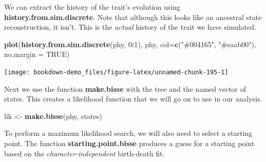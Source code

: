 \documentclass[
]{book}
\newenvironment{Shaded}{\begin{snugshade}}{\end{snugshade}}
\newcommand{\DataTypeTok}[1]{\textcolor[rgb]{0.13,0.29,0.53}{#1}}
\newcommand{\DecValTok}[1]{\textcolor[rgb]{0.00,0.00,0.81}{#1}}
\newcommand{\KeywordTok}[1]{\textcolor[rgb]{0.13,0.29,0.53}{\textbf{#1}}}
\newcommand{\NormalTok}[1]{#1}
\newcommand{\OperatorTok}[1]{\textcolor[rgb]{0.81,0.36,0.00}{\textbf{#1}}}
\newcommand{\OtherTok}[1]{\textcolor[rgb]{0.56,0.35,0.01}{#1}}
\newcommand{\StringTok}[1]{\textcolor[rgb]{0.31,0.60,0.02}{#1}}
\begin{document}
\begin{Shaded}
\end{Shaded}

We can extract the history of the trait's evolution using \textbf{history.from.sim.discrete}. Note that although this looks like an ancestral state reconstruction, it isn't. This is the \emph{actual} history of the trait we have simulated.

\begin{Shaded}
\begin{Highlighting}[]
\KeywordTok{plot}\NormalTok{(}\KeywordTok{history.from.sim.discrete}\NormalTok{(phy, }\DecValTok{0}\OperatorTok{:}\DecValTok{1}\NormalTok{), }
\NormalTok{     phy, }\DataTypeTok{col=}\KeywordTok{c}\NormalTok{(}\StringTok{"\#004165"}\NormalTok{, }\StringTok{"\#eaab00"}\NormalTok{), }\DataTypeTok{no.margin =} \OtherTok{TRUE}\NormalTok{)}
\end{Highlighting}
\end{Shaded}

\begin{center}\texttt{[image: bookdown-demo\_files/figure-latex/unnamed-chunk-195-1]} \end{center}

Next we use the function \textbf{make.bisse} with the tree and the named vector of states. This creates a likelihood function that we will go on to use in our analysis.

\begin{Shaded}
\begin{Highlighting}[]
\NormalTok{lik \textless{}{-}}\StringTok{ }\KeywordTok{make.bisse}\NormalTok{(phy, states)}
\end{Highlighting}
\end{Shaded}

To perform a maximum likelihood search, we will also need to select a starting point. The function \textbf{starting.point.bisse} produces a guess for a starting point based on the \emph{character-independent} birth-death fit.
\end{document}
